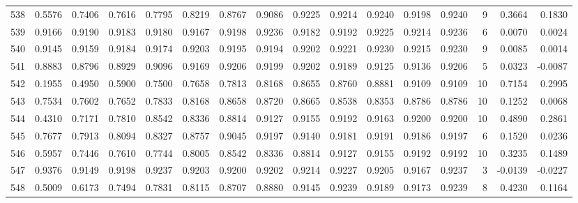 \begin{tabular}{lrrrrrrrrrrrrrrr}
538 &      0.5576 &  0.7406 &  0.7616 &  0.7795 &  0.8219 &  0.8767 &  0.9086 &  0.9225 &  0.9214 &  0.9240 &   0.9198 &     0.9240 &      9 &                    0.3664 &                     0.1830 \\
539 &      0.9166 &  0.9190 &  0.9183 &  0.9180 &  0.9167 &  0.9198 &  0.9236 &  0.9182 &  0.9192 &  0.9225 &   0.9214 &     0.9236 &      6 &                    0.0070 &                     0.0024 \\
540 &      0.9145 &  0.9159 &  0.9184 &  0.9174 &  0.9203 &  0.9195 &  0.9194 &  0.9202 &  0.9221 &  0.9230 &   0.9215 &     0.9230 &      9 &                    0.0085 &                     0.0014 \\
541 &      0.8883 &  0.8796 &  0.8929 &  0.9096 &  0.9169 &  0.9206 &  0.9199 &  0.9202 &  0.9189 &  0.9125 &   0.9136 &     0.9206 &      5 &                    0.0323 &                    -0.0087 \\
542 &      0.1955 &  0.4950 &  0.5900 &  0.7500 &  0.7658 &  0.7813 &  0.8168 &  0.8655 &  0.8760 &  0.8881 &   0.9109 &     0.9109 &     10 &                    0.7154 &                     0.2995 \\
543 &      0.7534 &  0.7602 &  0.7652 &  0.7833 &  0.8168 &  0.8658 &  0.8720 &  0.8665 &  0.8538 &  0.8353 &   0.8786 &     0.8786 &     10 &                    0.1252 &                     0.0068 \\
544 &      0.4310 &  0.7171 &  0.7810 &  0.8542 &  0.8336 &  0.8814 &  0.9127 &  0.9155 &  0.9192 &  0.9163 &   0.9200 &     0.9200 &     10 &                    0.4890 &                     0.2861 \\
545 &      0.7677 &  0.7913 &  0.8094 &  0.8327 &  0.8757 &  0.9045 &  0.9197 &  0.9140 &  0.9181 &  0.9191 &   0.9186 &     0.9197 &      6 &                    0.1520 &                     0.0236 \\
546 &      0.5957 &  0.7446 &  0.7610 &  0.7744 &  0.8005 &  0.8542 &  0.8336 &  0.8814 &  0.9127 &  0.9155 &   0.9192 &     0.9192 &     10 &                    0.3235 &                     0.1489 \\
547 &      0.9376 &  0.9149 &  0.9198 &  0.9237 &  0.9203 &  0.9200 &  0.9202 &  0.9214 &  0.9227 &  0.9205 &   0.9167 &     0.9237 &      3 &                   -0.0139 &                    -0.0227 \\
548 &      0.5009 &  0.6173 &  0.7494 &  0.7831 &  0.8115 &  0.8707 &  0.8880 &  0.9145 &  0.9239 &  0.9189 &   0.9173 &     0.9239 &      8 &                    0.4230 &                     0.1164 \\

\end{tabular}
